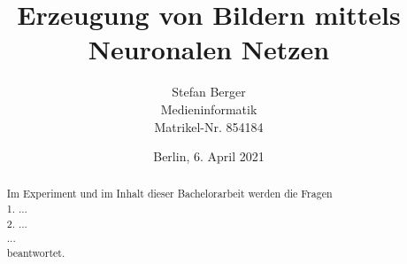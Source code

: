 \titlehead{Berliner Hochschule für Technik Berlin\\Fachbereich VI -- Informatik und Medien}
\subject{Bachelorarbeit}
\title{Erzeugung von Bildern mittels Neuronalen Netzen}
\author{Stefan Berger\\Medieninformatik\\Matrikel-Nr. 854184}
\date{Berlin, 6. April 2021}

\publishers{Betreut von: Prof.~Dr.~F.~Gers \\ \bigskip Gutachter: Prof.~Dr.~J.~Schimkat}


\maketitle

\begin{abstract}
Im Experiment und im Inhalt dieser Bachelorarbeit werden die Fragen \\
1. ...\\
2. ...\\
...\\
beantwortet.
\end{abstract}
